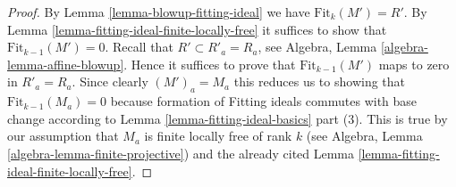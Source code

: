 \documentclass[10pt,a4paper]{amsart}
\theoremstyle{plain}
\theoremstyle{definition}
\theoremstyle{remark}
\numberwithin{equation}{subsection}
\begin{document}
\begin{proof}
By Lemma \ref{lemma-blowup-fitting-ideal} we have
$\text{Fit}_k(M') = R'$. By Lemma \ref{lemma-fitting-ideal-finite-locally-free}
it suffices to show that $\text{Fit}_{k - 1}(M') = 0$.
Recall that $R' \subset R'_a = R_a$, see
Algebra, Lemma \ref{algebra-lemma-affine-blowup}.
Hence it suffices to prove that $\text{Fit}_{k - 1}(M')$
maps to zero in $R'_a = R_a$.
Since clearly $(M')_a = M_a$ this reduces us to showing
that $\text{Fit}_{k - 1}(M_a) = 0$
because formation of Fitting ideals commutes with base
change according to Lemma \ref{lemma-fitting-ideal-basics} part (3).
This is true by our assumption that
$M_a$ is finite locally free of rank $k$
(see Algebra, Lemma \ref{algebra-lemma-finite-projective})
and the already cited Lemma \ref{lemma-fitting-ideal-finite-locally-free}.
\end{proof}
\end{document}

